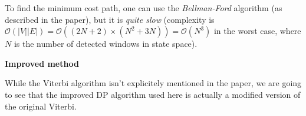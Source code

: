 \documentclass{letter}
\newcommand{\subsection}[1]{\medskip\bigskip

\noindent\textbf{\Large #1}}
\newcommand{\tmem}[1]{{\em #1\/}}
\begin{document}
To find the minimum cost path, one can use the {\tmem{Bellman-Ford}} algorithm
(as described in the paper), but it is {\tmem{quite slow}} (complexity is
$\mathcal{O} \left( \left| V \right|  \right| E \left| \right) =\mathcal{O}
\left( \left( 2 N + 2 \right) \times \left( N^2 + 3 N \right) \right)
=\mathcal{O} \left( N^3 \right)$ in the worst case, where $N$ is the number of
detected windows in state space).

\subsection{Improved method}

While the Viterbi algorithm isn't explicitely mentioned in the paper, we are
going to see that the improved DP algorithm used here is actually a modified
version of the original Viterbi.
\end{document}
